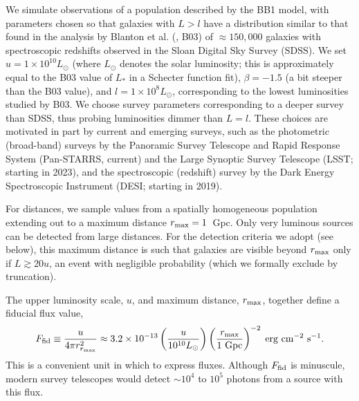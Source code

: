 We simulate observations of a population described by the BB1 model, with parameters chosen so that galaxies with $L>l$ have a distribution similar to that found in the analysis by Blanton et al. (\citealt{blanton2003galaxy}, B03) of $\approx 150,000$ galaxies with spectroscopic redshifts observed in the Sloan Digital Sky Survey (SDSS).
We set $u = 1\times 10^{10} L_\odot$ (where $L_\odot$ denotes the solar luminosity; this is approximately equal to the B03 value of $L_*$ in a Schecter function fit), $\beta = -1.5$ (a bit steeper than the B03 value), and $l= 1\times 10^{8} L_\odot$, corresponding to the lowest luminosities studied by B03.
We choose survey parameters corresponding to a deeper survey than SDSS, thus probing luminosities dimmer than $L=l$.
These choices are motivated in part by current and emerging surveys, such as the photometric (broad-band) surveys by the Panoramic Survey Telescope and Rapid Response System (Pan-STARRS, current) and the Large Synoptic Survey Telescope (LSST; starting in 2023),   and the spectroscopic (redshift) survey by the Dark Energy Spectroscopic Instrument (DESI; starting in 2019).

For distances, we sample values from a spatially homogeneous population extending out to a maximum distance $r_{\rm max} = 1$~Gpc.
Only very luminous sources can be detected from large distances.
For the detection criteria we adopt (see below), this maximum distance is such that galaxies are visible beyond $r_{\rm max}$ only if $L \gtrsim 20u$, an event with negligible probability (which we formally exclude by truncation).



The upper luminosity scale, $u$, and maximum distance, $r_{\rm max}$, together define a fiducial flux value,
\begin{equation}\label{eq:Ffid}
F_{\rm fid}
  \equiv \frac{u}{4\pi r_{r_{\rm max}}^2} 
  \approx 3.2\times 10^{-13} \left(\frac{u}{10^{10} L_\odot}\right)
      \left(\frac{r_{\rm max}}{1~\text{Gpc}}\right)^{-2}\;
      \text{erg cm$^{-2}$ s$^{-1}$}.
\end{equation}
This is a convenient unit in which to express fluxes.
Although $F_{\rm fid}$ is minuscule, modern survey telescopes would detect $\sim 10^4$ to $10^5$ photons from a source with this flux.



